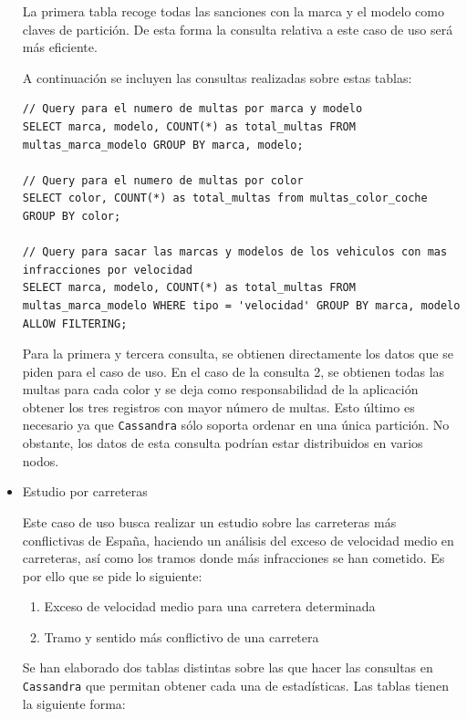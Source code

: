 \documentclass[]{article}
\begin{document}
\begin{itemize}
    La primera tabla recoge todas las sanciones con la marca y el modelo como claves de partición. De esta forma la consulta relativa a este caso de uso será más eficiente.

    A continuación se incluyen las consultas realizadas sobre estas tablas:

    \lstset{style=cql}
    \begin{lstlisting}[language=cql, caption=Querys para el caso de uso 1]
// Query para el numero de multas por marca y modelo
SELECT marca, modelo, COUNT(*) as total_multas FROM multas_marca_modelo GROUP BY marca, modelo;

// Query para el numero de multas por color
SELECT color, COUNT(*) as total_multas from multas_color_coche GROUP BY color;

// Query para sacar las marcas y modelos de los vehiculos con mas infracciones por velocidad
SELECT marca, modelo, COUNT(*) as total_multas FROM multas_marca_modelo WHERE tipo = 'velocidad' GROUP BY marca, modelo ALLOW FILTERING;
    \end{lstlisting}

    Para la primera y tercera consulta, se obtienen directamente los datos que
    se piden para el caso de uso. En el caso de la consulta 2, se obtienen
    todas las multas para cada color y se deja como responsabilidad de la
    aplicación obtener los tres registros con mayor número de multas. Esto último
    es necesario ya que \texttt{Cassandra} sólo soporta ordenar en una única
    partición. No obstante, los datos de esta consulta podrían estar
    distribuidos en varios nodos.

    \item Estudio por carreteras

    Este caso de uso busca realizar un estudio sobre las carreteras más
    conflictivas de España, haciendo un análisis del exceso de velocidad medio
    en carreteras, así como los tramos donde más infracciones se han cometido.
    Es por ello que se pide lo siguiente:

    \begin{enumerate}
        \item Exceso de velocidad medio para una carretera determinada
        \item Tramo y sentido más conflictivo de una carretera 
    \end{enumerate}

    Se han elaborado dos tablas distintas sobre las que hacer las consultas en
    \texttt{Cassandra} que permitan obtener cada una de estadísticas. Las
    tablas tienen la siguiente forma:  


\end{itemize}
\end{document}
